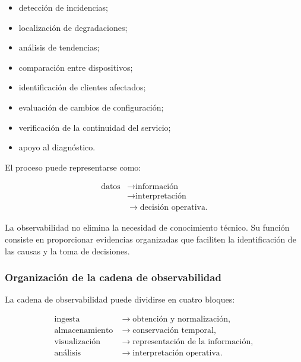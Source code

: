 \begin{itemize}
    \item detección de incidencias;

    \item localización de degradaciones;

    \item análisis de tendencias;

    \item comparación entre dispositivos;

    \item identificación de clientes afectados;

    \item evaluación de cambios de configuración;

    \item verificación de la continuidad del servicio;

    \item apoyo al diagnóstico.
\end{itemize}

El proceso puede representarse como:

\[
\begin{aligned}
    \text{datos}
    &\longrightarrow
    \text{información}\\
    &\longrightarrow
    \text{interpretación}\\
    &\longrightarrow
    \text{decisión operativa}.
\end{aligned}
\]

La observabilidad no elimina la necesidad de conocimiento técnico. Su
función consiste en proporcionar evidencias organizadas que faciliten la
identificación de las causas y la toma de decisiones.


\subsubsection*{Organización de la cadena de observabilidad}

La cadena de observabilidad puede dividirse en cuatro bloques:

\[
\begin{aligned}
    \text{ingesta}
    &\longrightarrow
    \text{obtención y normalización},\\
    \text{almacenamiento}
    &\longrightarrow
    \text{conservación temporal},\\
    \text{visualización}
    &\longrightarrow
    \text{representación de la información},\\
    \text{análisis}
    &\longrightarrow
    \text{interpretación operativa}.
\end{aligned}
\]


